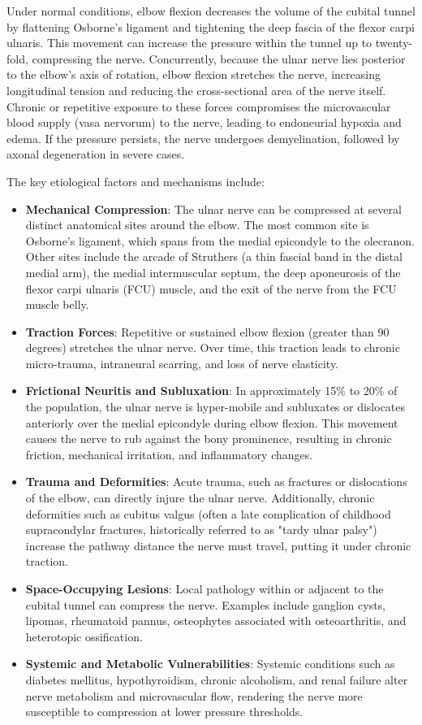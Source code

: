 Under normal conditions, elbow flexion decreases the volume of the cubital tunnel by flattening Osborne's ligament and tightening the deep fascia of the flexor carpi ulnaris. This movement can increase the pressure within the tunnel up to twenty-fold, compressing the nerve. Concurrently, because the ulnar nerve lies posterior to the elbow's axis of rotation, elbow flexion stretches the nerve, increasing longitudinal tension and reducing the cross-sectional area of the nerve itself. Chronic or repetitive exposure to these forces compromises the microvascular blood supply (vasa nervorum) to the nerve, leading to endoneurial hypoxia and edema. If the pressure persists, the nerve undergoes demyelination, followed by axonal degeneration in severe cases.

The key etiological factors and mechanisms include:
\begin{itemize}
  \item \textbf{Mechanical Compression}: The ulnar nerve can be compressed at several distinct anatomical sites around the elbow. The most common site is Osborne's ligament, which spans from the medial epicondyle to the olecranon. Other sites include the arcade of Struthers (a thin fascial band in the distal medial arm), the medial intermuscular septum, the deep aponeurosis of the flexor carpi ulnaris (FCU) muscle, and the exit of the nerve from the FCU muscle belly.
  \item \textbf{Traction Forces}: Repetitive or sustained elbow flexion (greater than 90 degrees) stretches the ulnar nerve. Over time, this traction leads to chronic micro-trauma, intraneural scarring, and loss of nerve elasticity.
  \item \textbf{Frictional Neuritis and Subluxation}: In approximately 15\% to 20\% of the population, the ulnar nerve is hyper-mobile and subluxates or dislocates anteriorly over the medial epicondyle during elbow flexion. This movement causes the nerve to rub against the bony prominence, resulting in chronic friction, mechanical irritation, and inflammatory changes.
  \item \textbf{Trauma and Deformities}: Acute trauma, such as fractures or dislocations of the elbow, can directly injure the ulnar nerve. Additionally, chronic deformities such as cubitus valgus (often a late complication of childhood supracondylar fractures, historically referred to as "tardy ulnar palsy") increase the pathway distance the nerve must travel, putting it under chronic traction.
  \item \textbf{Space-Occupying Lesions}: Local pathology within or adjacent to the cubital tunnel can compress the nerve. Examples include ganglion cysts, lipomas, rheumatoid pannus, osteophytes associated with osteoarthritis, and heterotopic ossification.
  \item \textbf{Systemic and Metabolic Vulnerabilities}: Systemic conditions such as diabetes mellitus, hypothyroidism, chronic alcoholism, and renal failure alter nerve metabolism and microvascular flow, rendering the nerve more susceptible to compression at lower pressure thresholds.
\end{itemize}

